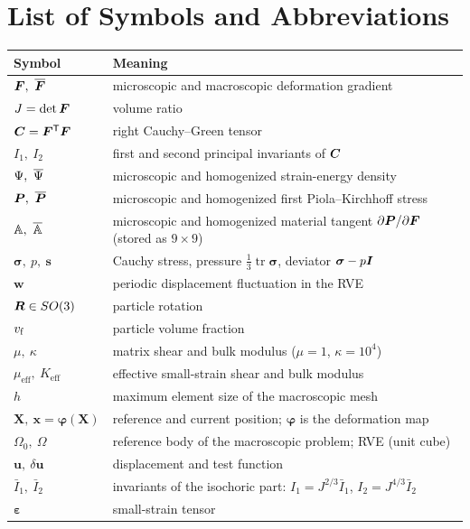 \chapter*{List of Symbols and Abbreviations}

\begin{longtable}{@{}p{}p{}@{}}
\toprule
Symbol & Meaning\\
\midrule
\endhead
$\F,\ \Fbar$ & microscopic and macroscopic deformation gradient\\
$J=\det\bm F$ & volume ratio\\
$\bm C=\bm F^{\mathsf T}\bm F$ & right Cauchy--Green tensor\\
$I_1,\ I_2$ & first and second principal invariants of $\bm C$\\
$\Psi,\ \Psibar$ & microscopic and homogenized strain-energy density\\
$\Pstress,\ \Pbar$ & microscopic and homogenized first Piola--Kirchhoff stress\\
$\Aten,\ \Abar$ & microscopic and homogenized material tangent $\partial\bm P/\partial\bm F$ (stored as $9\times9$)\\
$\bm\sigma,\ p,\ \bm s$ & Cauchy stress, pressure $\tfrac13\operatorname{tr}\bm\sigma$, deviator $\bm\sigma-p\bm I$\\
$\bm w$ & periodic displacement fluctuation in the RVE\\
$\bm R\in SO(3)$ & particle rotation\\
$v_{\mathrm f}$ & particle volume fraction\\
$\mu,\ \kappa$ & matrix shear and bulk modulus ($\mu=1$, $\kappa=10^4$)\\
$\mu_{\mathrm{eff}},\ K_{\mathrm{eff}}$ & effective small-strain shear and bulk modulus\\
$h$ & maximum element size of the macroscopic mesh\\
$\bm X,\ \bm x=\bm\varphi(\bm X)$ & reference and current position; $\bm\varphi$ is the deformation map\\
$\Omega_0,\ \Omega$ & reference body of the macroscopic problem; RVE (unit cube)\\
$\bm u,\ \delta\bm u$ & displacement and test function\\
$\bar I_1,\ \bar I_2$ & invariants of the isochoric part: $I_1=J^{2/3}\bar I_1$, $I_2=J^{4/3}\bar I_2$\\
$\bm\varepsilon$ & small-strain tensor\\

\end{longtable}
